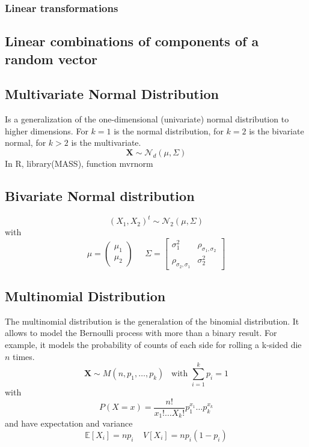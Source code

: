 \subsubsection{Linear transformations}

\subsection{Linear combinations of components of a random vector}

\subsection{Multivariate Normal Distribution}
Is a generalization of the one-dimensional (univariate) normal distribution to
higher dimensions. For $k=1$ is the normal distribution, for $k=2$ is the
bivariate normal, for $k>2$ is the multivariate. 
\[ \textbf{X} \sim \mathcal{N}_d(\mu,\Sigma)\]
In R, library(MASS), function mvrnorm

\subsection{Bivariate Normal distribution}
\[ (X_1,X_2)^t \sim \mathcal{N}_2(\mu,\Sigma) \] with
\[ \mu=\begin{pmatrix}\mu_1\\\mu_2\end{pmatrix}\;\;\;\;\; \Sigma=\begin{bmatrix}
    \sigma_1^2 & \rho_{\sigma_1,\sigma_2}\\
        \rho_{\sigma_2,\sigma_1} & \sigma^2_2
    \end{bmatrix}
\]

\subsection{Multinomial Distribution}
The multinomial distribution is the generalation of the binomial distribution.
It allows to model the Bernoulli process with more than a binary result.  For
example, it models the probability of counts of each side for rolling a k-sided
die $n$ times.
\[ \textbf{X} \sim M(n,p_1,\dots,p_k)\;\;\; \text{with }\sum_{i=1}^k p_i = 1 \]
with
\[ P(X=x) = \frac{n!}{x_1!\dots X_k!}p_1^{x_1}\dots p_k^{x_k} \]
and have expectation and variance
\[ \mathbb{E}[X_i]=np_i \;\;\;\; V[X_i] = np_i(1-p_i) \]

